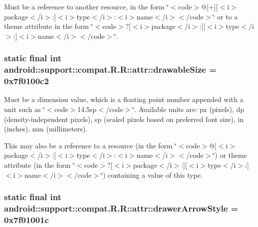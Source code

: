 Must be a reference to another resource, in the form \char`\"{}$<$code$>$@\mbox{[}+\mbox{]}\mbox{[}$<$i$>$package$<$/i$>$:\mbox{]}$<$i$>$type$<$/i$>$:$<$i$>$name$<$/i$>$$<$/code$>$\char`\"{} or to a theme attribute in the form \char`\"{}$<$code$>$?\mbox{[}$<$i$>$package$<$/i$>$:\mbox{]}\mbox{[}$<$i$>$type$<$/i$>$:\mbox{]}$<$i$>$name$<$/i$>$$<$/code$>$\char`\"{}. \hypertarget{classandroid_1_1support_1_1compat_1_1_r_1_1attr_0ef1be666a51425aa996ebf76fbde5df}{
\subsubsection[{drawableSize}]{\setlength{\rightskip}{0pt plus 5cm}static final int android::support::compat.R.R::attr::drawableSize = 0x7f0100c2}}
\label{classandroid_1_1support_1_1compat_1_1_r_1_1attr_0ef1be666a51425aa996ebf76fbde5df}


Must be a dimension value, which is a floating point number appended with a unit such as \char`\"{}$<$code$>$14.5sp$<$/code$>$\char`\"{}. Available units are: px (pixels), dp (density-independent pixels), sp (scaled pixels based on preferred font size), in (inches), mm (millimeters). 

This may also be a reference to a resource (in the form \char`\"{}$<$code$>$@\mbox{[}$<$i$>$package$<$/i$>$:\mbox{]}$<$i$>$type$<$/i$>$:$<$i$>$name$<$/i$>$$<$/code$>$\char`\"{}) or theme attribute (in the form \char`\"{}$<$code$>$?\mbox{[}$<$i$>$package$<$/i$>$:\mbox{]}\mbox{[}$<$i$>$type$<$/i$>$:\mbox{]}$<$i$>$name$<$/i$>$$<$/code$>$\char`\"{}) containing a value of this type. \hypertarget{classandroid_1_1support_1_1compat_1_1_r_1_1attr_7c69b108fdfccceea239bdebf71c5eb5}{
\subsubsection[{drawerArrowStyle}]{\setlength{\rightskip}{0pt plus 5cm}static final int android::support::compat.R.R::attr::drawerArrowStyle = 0x7f01001c}}
\label{classandroid_1_1support_1_1compat_1_1_r_1_1attr_7c69b108fdfccceea239bdebf71c5eb5}


